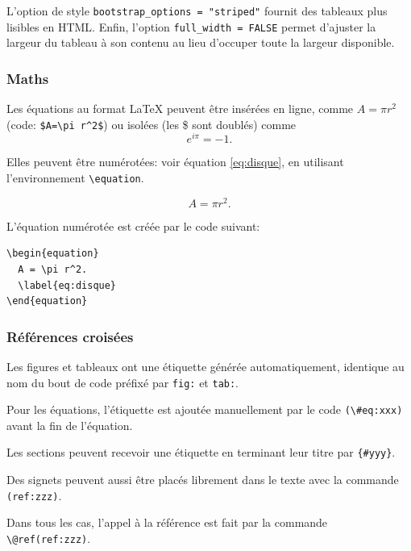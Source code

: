 \documentclass[
  12pt,
  french,
  a4paper,
  extrafontsizes,onecolumn,openright
  ]{memoir}
\begin{document}
L'option de style \texttt{bootstrap\_options\ =\ "striped"} fournit des tableaux plus lisibles en HTML.
Enfin, l'option \texttt{full\_width\ =\ FALSE} permet d'ajuster la largeur du tableau à son contenu au lieu d'occuper toute la largeur disponible.

\hypertarget{maths}{%
\subsubsection{Maths}\label{maths}}

Les équations au format LaTeX peuvent être insérées en ligne, comme \(A=\pi r^2\) (code: \texttt{\$A=\textbackslash{}pi\ r\^{}2\$}) ou isolées (les \$ sont doublés) comme \[e^{i \pi} = -1.\]

Elles peuvent être numérotées: voir équation \eqref{eq:disque}, en utilisant l'environnement \texttt{\textbackslash{}equation}.

\begin{equation}
  A = \pi r^2.
  \label{eq:disque}
\end{equation}

L'équation numérotée est créée par le code suivant:

\begin{verbatim}
\begin{equation}
  A = \pi r^2.
  \label{eq:disque}
\end{equation}
\end{verbatim}

\hypertarget{ruxe9fuxe9rences-croisuxe9es}{%
\subsubsection{Références croisées}\label{ruxe9fuxe9rences-croisuxe9es}}

Les figures et tableaux ont une étiquette générée automatiquement, identique au nom du bout de code préfixé par \texttt{fig:} et \texttt{tab:}.

Pour les équations, l'étiquette est ajoutée manuellement par le code \texttt{(\textbackslash{}\#eq:xxx)} avant la fin de l'équation.

Les sections peuvent recevoir une étiquette en terminant leur titre par \texttt{\{\#yyy\}}.

Des signets peuvent aussi être placés librement dans le texte avec la commande \texttt{(ref:zzz)}.

Dans tous les cas, l'appel à la référence est fait par la commande \texttt{\textbackslash{}@ref(ref:zzz)}.
\end{document}
